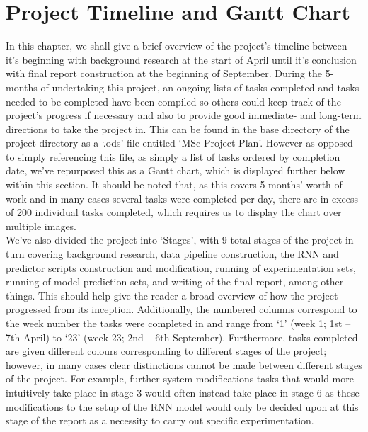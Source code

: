 \documentclass[12pt,twoside]{report}
\begin{document}
\chapter{Project Timeline and Gantt Chart\\}

\quad In this chapter, we shall give a brief overview of the project’s timeline between it’s beginning with background research at the start of April until it’s conclusion with final report construction at the beginning of September. During the 5-months of undertaking this project, an ongoing lists of tasks completed and tasks needed to be completed have been compiled so others could keep track of the project’s progress if necessary and also to provide good immediate- and long-term directions to take the project in. This can be found in the base directory of the project directory as a ‘.ods’ file entitled ‘MSc Project Plan’. However as opposed to simply referencing this file, as simply a list of tasks ordered by completion date, we’ve repurposed this as a Gantt chart, which is displayed further below within this section. It should be noted that, as this covers 5-months’ worth of work and in many cases several tasks were completed per day, there are in excess of 200 individual tasks completed, which requires us to display the chart over multiple images.\\

\quad We’ve also divided the project into ‘Stages’, with 9 total stages of the project in turn covering background research, data pipeline construction, the RNN and predictor scripts construction and modification, running of experimentation sets, running of model prediction sets, and writing of the final report, among other things. This should help give the reader a broad overview of how the project progressed from its inception. Additionally, the numbered columns correspond to the week number the tasks were completed in and range from ‘1’ (week 1; 1st – 7th April) to ‘23’ (week 23; 2nd – 6th September). Furthermore, tasks completed are given different colours corresponding to different stages of the project; however, in many cases clear distinctions cannot be made between different stages of the project. For example, further system modifications tasks that would more intuitively take place in stage 3 would often instead take place in stage 6 as these modifications to the setup of the RNN model would only be decided upon at this stage of the report as a necessity to carry out specific experimentation.
\end{document}
